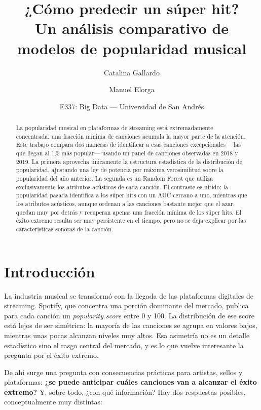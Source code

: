 \documentclass[11pt,a4paper]{article}
\title{\textbf{¿Cómo predecir un súper hit?}\\[.3em]
       \large Un análisis comparativo de modelos de popularidad musical}
\author{Catalina Gallardo \and Manuel Elorga}
\date{E337: Big Data --- Universidad de San Andrés}
\begin{document}
\maketitle

\begin{abstract}
\noindent
La popularidad musical en plataformas de streaming está extremadamente
concentrada: una fracción mínima de canciones acumula la mayor parte de la
atención. Este trabajo compara dos maneras de identificar a esas canciones
excepcionales ---las que llegan al 1\% más popular--- usando un panel de
\nPanel{} canciones observadas en 2018 y 2019. La primera aprovecha
únicamente la estructura estadística de la distribución de popularidad,
ajustando una ley de potencia por máxima verosimilitud sobre la popularidad
del año anterior. La segunda es un Random Forest que utiliza exclusivamente
los atributos acústicos de cada canción. El contraste es nítido: la
popularidad pasada identifica a los súper hits con un AUC cercano a uno,
mientras que los atributos acústicos, aunque ordenan a las canciones bastante
mejor que el azar, quedan muy por detrás y recuperan apenas una fracción
mínima de los súper hits. El éxito
extremo resulta ser muy persistente en el tiempo, pero no se deja explicar
por las características sonoras de la canción.
\end{abstract}

\section{Introducción}

La industria musical se transformó con la llegada de las plataformas
digitales de streaming. Spotify, que concentra una porción dominante del
mercado, publica para cada canción un \textit{popularity score} entre 0 y
100. La distribución de ese score está lejos de ser simétrica: la mayoría de
las canciones se agrupa en valores bajos, mientras unas pocas alcanzan
niveles muy altos. Esa asimetría no es un detalle estadístico sino el rasgo
central del mercado, y es lo que vuelve interesante la pregunta por el éxito
extremo.

De ahí surge una pregunta con consecuencias prácticas para artistas, sellos y
plataformas: \textbf{¿se puede anticipar cuáles canciones van a alcanzar el
éxito extremo?} Y, sobre todo, ¿con qué información? Hay dos respuestas
posibles, conceptualmente muy distintas:
\end{document}
